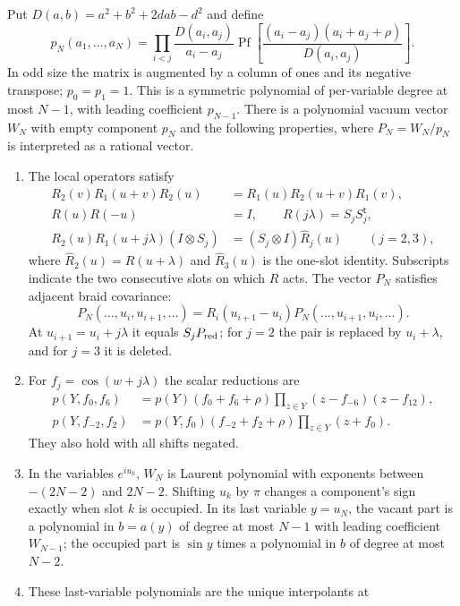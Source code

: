 \begin{proposition}\label{prop:E-open-input}
Put $D(a,b)=a^2+b^2+2dab-d^2$ and define
\[
 p_N(a_1,\ldots,a_N)=
 \prod_{i<j}\frac{D(a_i,a_j)}{a_i-a_j}
 \operatorname{Pf}\left[
  \frac{(a_i-a_j)(a_i+a_j+\rho)}{D(a_i,a_j)}\right].
\]
In odd size the matrix is augmented by a column of ones and its
negative transpose; $p_0=p_1=1$. This is a symmetric polynomial of
per-variable degree at most $N-1$, with leading coefficient $p_{N-1}$.
There is a polynomial vacuum vector $W_N$ with empty component $p_N$
and the following properties, where $P_N=W_N/p_N$ is interpreted as
a rational vector.
\begin{enumerate}
\item The local operators satisfy
\[
\begin{aligned}
R_2(v)R_1(u+v)R_2(u)&=R_1(u)R_2(u+v)R_1(v),\\
R(u)R(-u)&=I,\qquad R(j\lambda)=S_jS_j^{\mathsf t},\\
R_2(u)R_1(u+j\lambda)(I\otimes S_j)
  &=(S_j\otimes I)\widehat R_j(u)\qquad(j=2,3),
\end{aligned}
\]
where $\widehat R_2(u)=R(u+\lambda)$ and $\widehat R_3(u)$ is the
one-slot identity. Subscripts indicate the two consecutive slots on
which $R$ acts. The vector $P_N$ satisfies adjacent braid covariance:
\[
P_N(\ldots,u_i,u_{i+1},\ldots)
 =R_i(u_{i+1}-u_i)P_N(\ldots,u_{i+1},u_i,\ldots).
\]
At
$u_{i+1}=u_i+j\lambda$ it equals $S_jP_{\rm red}$; for $j=2$ the
pair is replaced by $u_i+\lambda$, and for $j=3$ it is deleted.
\item For $f_j=\cos(w+j\lambda)$ the scalar reductions are
\[
\begin{aligned}
 p(Y,f_0,f_6)&=p(Y)(f_0+f_6+\rho)
                  \prod_{z\in Y}(z-f_{-6})(z-f_{12}),\\
 p(Y,f_{-2},f_2)&=p(Y,f_0)(f_{-2}+f_2+\rho)
                  \prod_{z\in Y}(z+f_0).
\end{aligned}
\]
They also hold with all shifts negated.
\item In the variables $e^{iu_k}$, $W_N$ is Laurent polynomial with
exponents between $-(2N-2)$ and $2N-2$. Shifting $u_k$ by $\pi$
changes a component's sign exactly when slot $k$ is occupied.
In its last variable $y=u_N$, the vacant part is a polynomial in
$b=a(y)$ of degree at most $N-1$ with leading coefficient $W_{N-1}$;
the occupied part is $\sin y$ times a polynomial in $b$ of degree at
most $N-2$.
\item These last-variable polynomials are the unique interpolants at

\end{enumerate}
\end{proposition}
